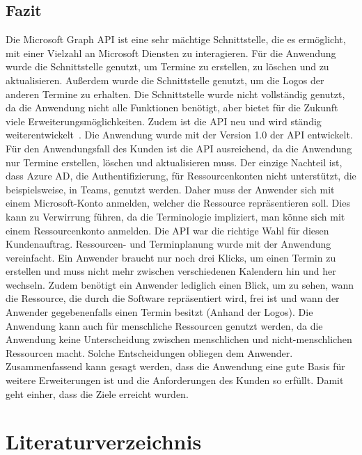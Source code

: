 \subsection{Fazit}\label{subsec:fazit}
Die Microsoft Graph API ist eine sehr mächtige Schnittstelle, die es ermöglicht, mit einer Vielzahl an Microsoft Diensten zu interagieren.
Für die Anwendung wurde die Schnittstelle genutzt, um Termine zu erstellen, zu löschen und zu aktualisieren.
Außerdem wurde die Schnittstelle genutzt, um die Logos der anderen Termine zu erhalten.
Die Schnittstelle wurde nicht vollständig genutzt, da die Anwendung nicht alle Funktionen benötigt, aber bietet für die Zukunft viele Erweiterungsmöglichkeiten.
Zudem ist die API neu und wird ständig weiterentwickelt~\cite{microsoft-graph-api-version}.
Die Anwendung wurde mit der Version 1.0 der API entwickelt.
Für den Anwendungsfall des Kunden ist die API ausreichend, da die Anwendung nur Termine erstellen, löschen und aktualisieren muss.
Der einzige Nachteil ist, dass Azure AD, die Authentifizierung, für Ressourcenkonten nicht unterstützt, die beispielsweise, in Teams, genutzt werden.
Daher muss der Anwender sich mit einem Microsoft-Konto anmelden, welcher die Ressource repräsentieren soll.
Dies kann zu Verwirrung führen, da die Terminologie impliziert, man könne sich mit einem Ressourcenkonto anmelden.
\newline
\newline
Die API war die richtige Wahl für diesen Kundenauftrag.
Ressourcen- und Terminplanung wurde mit der Anwendung vereinfacht.
Ein Anwender braucht nur noch drei Klicks, um einen Termin zu erstellen und muss nicht mehr zwischen verschiedenen Kalendern hin und her wechseln.
Zudem benötigt ein Anwender lediglich einen Blick, um zu sehen, wann die Ressource, die durch die Software repräsentiert wird, frei ist und wann der Anwender gegebenenfalls einen Termin besitzt (Anhand der Logos).
\newline
\newline
Die Anwendung kann auch für menschliche Ressourcen genutzt werden, da die Anwendung keine Unterscheidung zwischen menschlichen und nicht-menschlichen Ressourcen macht.
Solche Entscheidungen obliegen dem Anwender.
\newline
\newline
Zusammenfassend kann gesagt werden, dass die Anwendung eine gute Basis für weitere Erweiterungen ist und die Anforderungen des Kunden so erfüllt.
Damit geht einher, dass die Ziele erreicht wurden.
\newline
\newline
\justifying
\newpage
\section{Literaturverzeichnis}\label{sec:literaturverzeichnis}